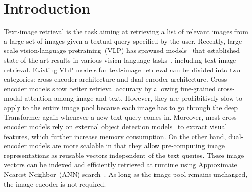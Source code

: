 \section{Introduction}
Text-image retrieval is the task aiming at retrieving a list of relevant images from 
a large set of images given a textual query specified by the user. 
Recently, large-scale vision-language pretraining~(VLP) has spawned models~\cite{tan-bansal-2019-lxmert,oscar,clip} that established state-of-the-art results in various vision-language tasks~\cite{vqa,nlvr}, including text-image retrieval. Existing VLP models for text-image retrieval can be divided into two categories: cross-encoder architecture and dual-encoder architecture. Cross-encoder models show better retrieval accuracy by allowing fine-grained cross-modal attention among image and text. However, they are prohibitively slow to apply to the entire image pool because each image has to go through the deep Transformer again whenever a new text query comes in. Moreover, most cross-encoder models rely on external object detection models~\cite{fasterrcnn} to extract visual features, which further increase memory consumption. On the other hand, dual-encoder models are more scalable in that they allow pre-computing image representations as 
reusable vectors independent of the text queries. These image vectors can be
indexed and efficiently retrieved at runtime using Approximate Nearest Neighbor~(ANN) 
search~\cite{faiss}. As long as the image pool remains unchanged, 
the image encoder is not required. 

